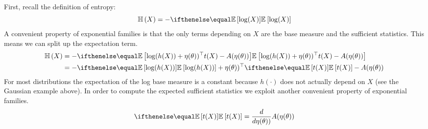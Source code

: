 \documentclass[a4paper, 11pt]{article}
\begin{document}
First, recall the definition of entropy:
\begin{equation}
\Ent{X} = -\E{\log(X)}
\end{equation}
A convenient property of exponential families is that the only terms depending on $ X $ are the base measure and the sufficient
statistics. This means we can split up the expectation term.
\begin{subequations}
\begin{align}
\Ent{X} &= -\E{\log(h(X)) + \eta(\theta))^{\top} t(X) - A(\eta(\theta))} \\
&=- \E{\log(h(X))} + \eta(\theta))^{\top} \E{t(X)} - A(\eta(\theta))
\end{align}
\end{subequations}
For most distributions the expectation of the log base measure is a constant because $ h(\cdot) $ does not actually depend on $ X $ (see the Gaussian example above). In order to compute the expected sufficient statistics we exploit another convenient property
of exponential families.
\begin{equation}
\E{t(X)} = \frac{d}{d\eta(\theta))}A(\eta(\theta))
\end{equation}

\end{document}
